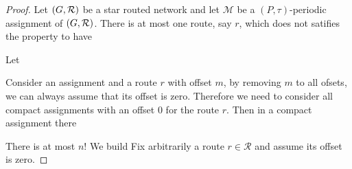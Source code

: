 \documentclass[a4paper,10pt]{article}
\begin{document}
{\begin{proof}
Let $(G, {\cal R})$ be a star routed network and let $\mathcal{M}$ be a $(P,\tau)$-periodic assignment of $(G, {\cal R})$.
There is at most one route, say $r$, which does not satifies the property to have 


Let

Consider an assignment and a route $r$ with offset $m$, by removing $m$ to all ofsets,
we can always assume that its offset is zero. Therefore we need to consider all compact assignments 
with an offset $0$ for the route $r$. Then in a compact assignment there 

There is at most $n!$
We build
Fix arbitrarily a route $r \in \mathcal{R}$ and assume its offset is zero.


\end{proof}

}
\end{document}
